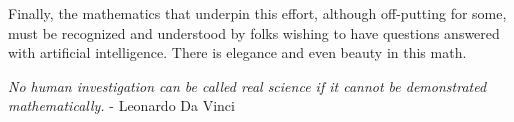 \justifying
Finally, the mathematics that underpin this effort, although off-putting for some, must be recognized and understood by
folks wishing to have questions answered with artificial intelligence. There is elegance and even beauty in this math.
\vspace{2mm}

\begin{displayquote}
	\emph{No human investigation can be called real science if it cannot be demonstrated mathematically.}
	- Leonardo Da Vinci
\end{displayquote}